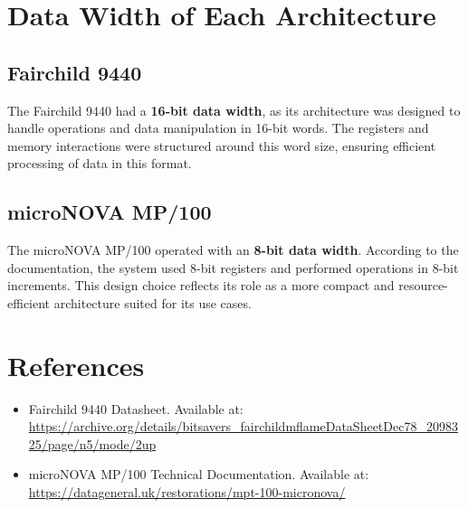 \documentclass[a4paper,12pt]{article}
\begin{document}
\section{Data Width of Each Architecture}

\subsection{Fairchild 9440}

The Fairchild 9440 had a \textbf{16-bit data width}, as its architecture was designed to handle operations and data manipulation in 16-bit words. The registers and memory interactions were structured around this word size, ensuring efficient processing of data in this format.

\subsection{microNOVA MP/100}

The microNOVA MP/100 operated with an \textbf{8-bit data width}. According to the documentation, the system used 8-bit registers and performed operations in 8-bit increments. This design choice reflects its role as a more compact and resource-efficient architecture suited for its use cases.



\section*{References}

\begin{itemize}
    \item Fairchild 9440 Datasheet. Available at: \url{https://archive.org/details/bitsavers_fairchildmflameDataSheetDec78_2098325/page/n5/mode/2up}
    \item microNOVA MP/100 Technical Documentation. Available at: \url{https://datageneral.uk/restorations/mpt-100-micronova/}
\end{itemize}
\end{document}
